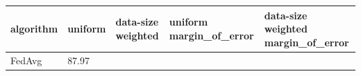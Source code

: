 \begin{tabular}{lllll}
\toprule
algorithm & uniform & data-size weighted & uniform margin_of_error & data-size weighted margin_of_error \\
\midrule
FedAvg & 87.97%
\bottomrule
\end{tabular}
